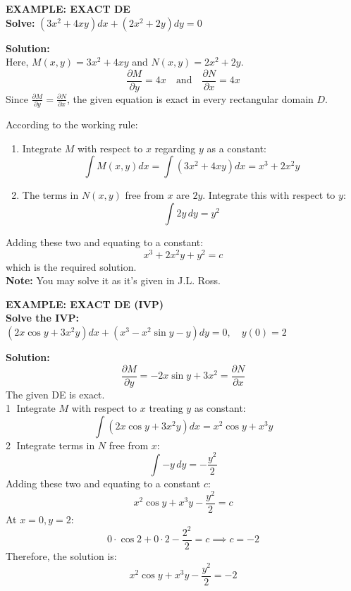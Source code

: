 \documentclass[11pt,a4paper]{article}
\begin{document}
\begin{tcolorbox}[colback=LightBg, colframe=BorderGray, arc=4mm]
    {\small\textbf{\textcolor{AccentBlue}{EXAMPLE: EXACT DE}}}
    \vspace{0.2cm}\\
    \textbf{Solve:} $\displaystyle (3x^2 + 4xy)dx + (2x^2 + 2y)dy = 0$
    
    \vspace{0.2cm}
    \textbf{Solution:} \\
    Here, $M(x,y) = 3x^2 + 4xy$ and $N(x,y) = 2x^2 + 2y$.
    \[ \frac{\partial M}{\partial y} = 4x \quad \text{and} \quad \frac{\partial N}{\partial x} = 4x \]
    Since $\frac{\partial M}{\partial y} = \frac{\partial N}{\partial x}$, the given equation is exact in every rectangular domain $D$.
    
    According to the working rule:
    \begin{enumerate}
        \item Integrate $M$ with respect to $x$ regarding $y$ as a constant:
        \[ \int M(x,y) dx = \int (3x^2 + 4xy) dx = x^3 + 2x^2y \]
        \item The terms in $N(x,y)$ free from $x$ are $2y$. Integrate this with respect to $y$:
        \[ \int 2y \, dy = y^2 \]
    \end{enumerate}
    Adding these two and equating to a constant:
    \[ x^3 + 2x^2y + y^2 = c \]
    which is the required solution. \\
    \textbf{Note:} You may solve it as it's given in J.L. Ross.
\end{tcolorbox}

\begin{tcolorbox}[colback=LightBg, colframe=BorderGray, arc=4mm]
    {\small\textbf{\textcolor{AccentBlue}{EXAMPLE: EXACT DE (IVP)}}}
    \vspace{0.2cm}\\
    \textbf{Solve the IVP:} $\displaystyle (2x\cos y + 3x^2y)dx + (x^3 - x^2\sin y - y)dy = 0, \quad y(0)=2$
    
    \vspace{0.2cm}
    \textbf{Solution:} \\
    \[ \frac{\partial M}{\partial y} = -2x\sin y + 3x^2 = \frac{\partial N}{\partial x} \]
    The given DE is exact. \\
    \textcircled{1} Integrate $M$ with respect to $x$ treating $y$ as constant:
    \[ \int (2x\cos y + 3x^2y)dx = x^2\cos y + x^3y \]
    \textcircled{2} Integrate terms in $N$ free from $x$:
    \[ \int -y \, dy = -\frac{y^2}{2} \]
    Adding these two and equating to a constant $c$:
    \[ x^2\cos y + x^3y - \frac{y^2}{2} = c \]
    At $x=0, y=2$:
    \[ 0 \cdot \cos 2 + 0 \cdot 2 - \frac{2^2}{2} = c \implies c = -2 \]
    Therefore, the solution is:
    \[ x^2\cos y + x^3y - \frac{y^2}{2} = -2 \]
\end{tcolorbox}
\end{document}
